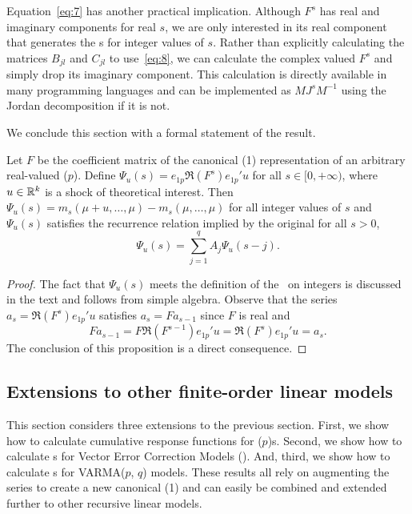 \documentclass[12pt,fleqn]{article}
\begin{document}
Equation~\eqref{eq:7} has another practical implication. Although
$F^s$ has real and imaginary components for real $s$, we are only
interested in its real component that generates the \IRF s for integer
values of $s$. Rather than explicitly calculating the matrices
$B_{jl}$ and $C_{jl}$ to use~\eqref{eq:8}, we can calculate the
complex valued $F^s$ and simply drop its imaginary component. This
calculation is directly available in many programming languages and
can be implemented as $M J^s M^{-1}$ using the Jordan decomposition if
it is not.

We conclude this section with a formal statement of the result.

\begin{proposition}
  \label{P1}
  Let $F$ be the coefficient matrix of the canonical \VAR(1)
  representation of an arbitrary real-valued \VAR($p$). Define
  $\Psi_u(s) = e_{1p} \Re(F^s) e_{1p}' u$ for all $s \in [0,+\infty)$, where
  $u \in \mathbb{R}^k$ is a shock of theoretical interest. Then
  $\Psi_u(s) = m_s(\mu + u, \dots, \mu) - m_s(\mu,\dots,\mu)$ for all
  integer values of $s$ and $\Psi_u(s)$ satisfies the recurrence
  relation implied by the original \VAR for all $s > 0$,
  \begin{equation}
    \label{eq:9}
    \Psi_u(s) = \sum_{j=1}^q A_j \Psi_u(s-j).
  \end{equation}
\end{proposition}
\begin{proof}
  The fact that $\Psi_u(s)$ meets the definition of the \IRF\ on
  integers is discussed in the text and follows from simple
  algebra. Observe that the series $a_s = \Re(F^s) e_{1p}'u$ satisfies
  $a_s = F a_{s-1}$ since $F$ is real and
  \[
    F a_{s-1} = F \Re(F^{s-1}) e_{1p}'u
    = \Re(F^s) e_{1p}'u
    = a_s.
  \]
  The conclusion of this proposition is a direct consequence.
\end{proof}

\subsection[Finite-order linear models]{Extensions to other finite-order linear models}
\label{S2.3}

This section considers three extensions to the previous section.
First, we show how to calculate cumulative response functions for
\VAR($p$)s. Second, we show how to calculate \IRF s for Vector Error
Correction Models (\VECM). And, third, we show how to calculate \IRF s
for VARMA($p$, $q$) models. These results all rely on augmenting the
series to create a new canonical \VAR(1) and can easily be combined
and extended further to other recursive linear models.
\end{document}
